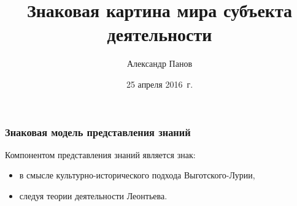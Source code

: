 \documentclass[default]{beamer}
\begin{document}
	
	\title[Знаковая картина мира]{Знаковая картина мира субъекта деятельности}
	\author[Панов]{Александр Панов}
	\date{25 апреля 2016~г.} 
	
	\begin{frame}
		\titlepage
	\end{frame}

	\begin{frame}
		\frametitle{Знаковая модель представления знаний}
		\small
		Компонентом представления знаний является знак:
		\begin{itemize}
			\item в смысле культурно-исторического подхода Выготского-Лурии,
			\item следуя теории деятельности Леонтьева.
		\end{itemize}
		

\end{frame}
\end{document}
